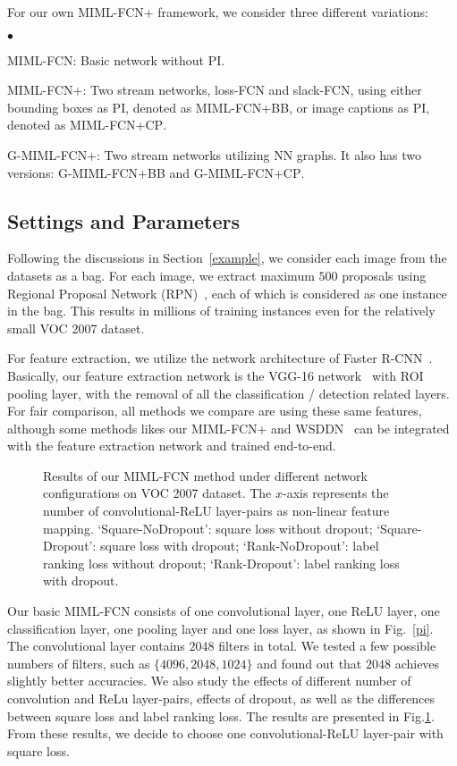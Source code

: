 \documentclass[10pt,twocolumn,letterpaper]{article}
\newcommand{\squishlist}{
	\begin{list}{$\bullet$}
		{ \setlength{\itemsep}{0pt}
			\setlength{\parsep}{1pt}
			\setlength{\topsep}{1pt}
			\setlength{\partopsep}{0pt}
			\setlength{\leftmargin}{1.5em}
			\setlength{\labelwidth}{1em}
			\setlength{\labelsep}{0.5em} } }
\newcommand{\squishend}{
	\end{list}  }
\begin{document}
For our own \textsc{MIML-FCN+} framework, we consider three
different variations: \squishlist \item \textsc{MIML-FCN}: Basic
network without PI. \item \textsc{MIML-FCN+}: Two stream networks,
loss-FCN and slack-FCN, using either bounding boxes as PI, denoted
as \textsc{MIML-FCN+BB}, or image captions as PI, denoted as
\textsc{MIML-FCN+CP}. \item \textsc{G-MIML-FCN+}: Two stream
networks utilizing NN graphs. It also has two versions:
\textsc{G-MIML-FCN+BB} and \textsc{G-MIML-FCN+CP}. \squishend

\subsection{Settings and Parameters}
Following the discussions in Section~\ref{example}, we consider
each image from the datasets as a bag. For each image, we extract
maximum $500$ proposals using Regional Proposal Network
(RPN)~\cite{Ren2015}, each of which is considered as one instance
in the bag. This results in millions of training instances even
for the relatively small \textsc{VOC 2007} dataset.

For feature extraction, we utilize the network architecture of
Faster R-CNN~\cite{Ren2015}. Basically, our feature extraction
network is the VGG-16 network~\cite{Simonyan2014} with ROI pooling
layer, with the removal of all the classification / detection
related layers. For fair comparison, all methods we compare are
using these same features, although some methods likes our
\textsc{MIML-FCN+} and WSDDN~\cite{Bilen2016} can be integrated
with the feature extraction network and trained end-to-end.
\begin{figure}
	\caption{Results of our MIML-FCN method under different network configurations on \textsc{VOC 2007} dataset. The $x$-axis represents the number of convolutional-ReLU layer-pairs as non-linear feature mapping. `Square-NoDropout': square loss without dropout; `Square-Dropout': square loss with dropout; `Rank-NoDropout': label ranking loss without dropout; `Rank-Dropout': label ranking loss with dropout.}
	\label{val}
\end{figure}

Our basic MIML-FCN consists of one convolutional layer, one ReLU
layer, one classification layer, one pooling layer and one loss
layer, as shown in Fig.~\ref{pi}. The convolutional layer contains
$2048$ filters in total. We tested a few possible numbers of filters, such as $\{4096,2048,1024\}$ and found out that $2048$ achieves slightly better accuracies. We also study the effects of different number
of convolution and ReLu layer-pairs, effects of dropout, as well
as the differences between square loss and label ranking loss. The
results are presented in Fig.\ref{val}. From these results, we
decide to choose one convolutional-ReLU layer-pair with square
loss.
\end{document}
